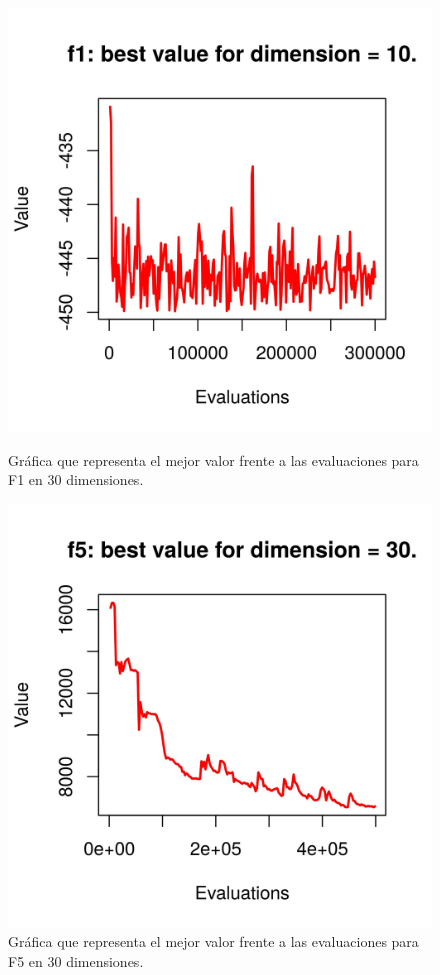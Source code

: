 \documentclass[11pt,a4paper]{article}
\begin{document}
	\begin{figure}[!h]
		\centering
		\begin{minipage}[b]{0.4\textwidth}
			\includegraphics[width=\textwidth]{Imagenes/MM_f1_d10.jpg}
			\caption{Gráfica que representa el mejor valor frente a las evaluaciones para F1 en 30 dimensiones.}
		\end{minipage}
		\hfill
		\begin{minipage}[b]{0.4\textwidth}
			\includegraphics[width=\textwidth]{Imagenes/MM_f5_d10.jpg}
			\caption{Gráfica que representa el mejor valor frente a las evaluaciones para F5 en 30 dimensiones.}
		\end{minipage}
	\end{figure}
	
\end{document}
